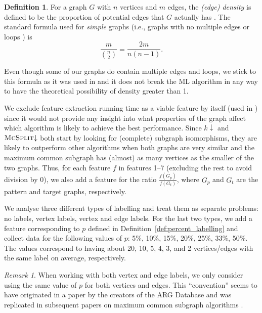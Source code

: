 \documentclass{l4proj}
\theoremstyle{definition}
\newtheorem{definition}{Definition}[chapter]
\theoremstyle{remark}
\newtheorem{remark}{Remark}[chapter]
\begin{document}
\begin{definition}
For a graph $G$ with $n$ vertices and $m$ edges, the \emph{(edge) density} is
defined to be the proportion of potential edges that $G$ actually has
\cite{DBLP:books/daglib/0030488}. The standard formula used for \emph{simple}
graphs (i.e., graphs with no multiple edges or loops
\cite{DBLP:books/ws/NishizekiR04}) is
\[ \frac{m}{\binom{n}{2}} = \frac{2m}{n(n-1)}. \]
\end{definition}

Even though some of our graphs do contain multiple edges and loops, we stick to
this formula as it was used in \cite{DBLP:conf/lion/KotthoffMS16} and it does
not break the ML algorithm in any way to have the theoretical possibility of
density greater than 1.

We exclude feature extraction running time as a viable feature by itself (used
in \cite{DBLP:conf/lion/KotthoffMS16}) since it would not provide any insight
into what properties of the graph affect which algorithm is likely to achieve
the best performance. Since $k{\downarrow}$ and $\textsc{McSplit}{\downarrow}$ both
start by looking for (complete) subgraph isomorphisms, they are likely to
outperform other algorithms when both graphs are very similar and the maximum
common subgraph has (almost) as many vertices as the smaller of the two graphs.
Thus, for each feature $f$ in features 1--7 (excluding the rest to avoid
division by 0), we also add a feature for the ratio $\frac{f(G_p)}{f(G_t)}$,
where $G_p$ and $G_t$ are the pattern and target graphs, respectively.

We analyse three different types of labelling and treat them as separate
problems: no labels, vertex labels, vertex and edge labels. For the last two
types, we add a feature corresponding to $p$ defined in
Definition~\ref{def:percent_labelling} and collect data for the following values
of $p$: 5\%, 10\%, 15\%, 20\%, 25\%, 33\%, 50\%. The values correspond to having
about 20, 10, 5, 4, 3, and 2 vertices/edges with the same label on average,
respectively.

\begin{remark}
  When working with both vertex and edge labels, we only consider using the same
  value of $p$ for both vertices and edges. This ``convention'' seems to have
  originated in a paper by the creators of the ARG Database
  \cite{DBLP:journals/jgaa/ConteFV07} and was replicated in subsequent papers on
  maximum common subgraph algorithms \cite{DBLP:conf/cp/McCreeshNPS16,
    DBLP:conf/cp/NdiayeS11}.
\end{remark}
\end{document}
